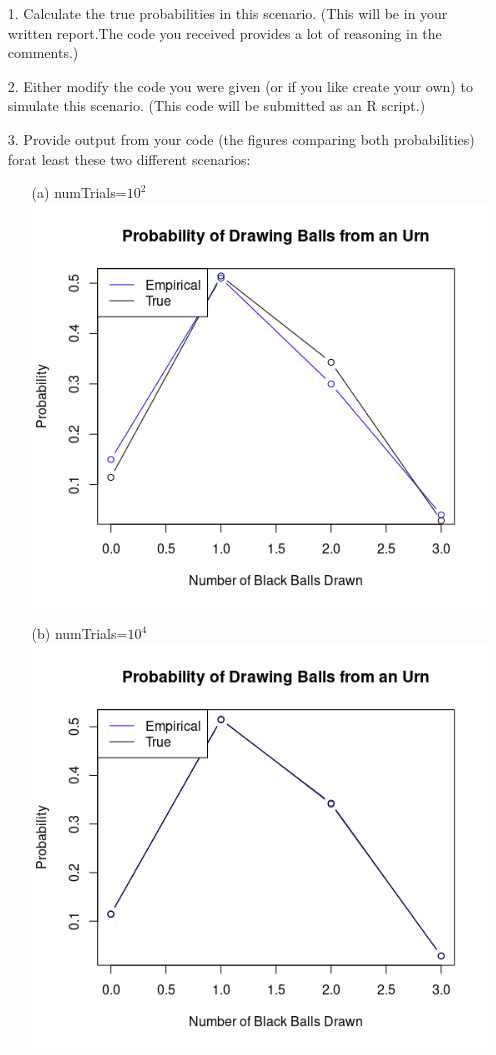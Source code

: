 \documentclass[a4paper]{article}
\begin{document}
\begin{itemize}
    \item[1.] Calculate the true probabilities in this scenario.  (This will be in your written report.The code you received provides a lot of reasoning in the comments.)
    \item[2.] Either modify the code you were given (or if you like create your own) to simulate this scenario. (This code will be submitted as an R script.)
    \item[3.] Provide output from your code (the figures comparing both probabilities) forat least these two different scenarios: \\
    \begin{itemize}
        \item[(a)] numTrials=$10^2$ \\
        \includegraphics{Rplot-100.png} \\ 
        \item[(b)] numTrials=$10^4$ \\
        \includegraphics{Rplot-10000.png} \\ 

\end{itemize}
\end{itemize}
\end{document}
